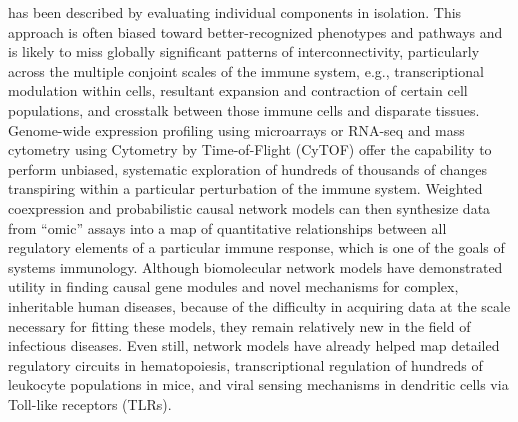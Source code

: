  has been described by evaluating individual components in isolation. This approach is often biased toward better-recognized phenotypes and pathways and is likely to miss globally significant patterns of interconnectivity, particularly across the multiple conjoint scales of the immune system, e.g., transcriptional modulation within cells, resultant expansion and contraction of certain cell populations, and crosstalk between those immune cells and disparate tissues.\autocite{Kidd2014} Genome-wide expression profiling using microarrays or RNA-seq and mass cytometry using Cytometry by Time-of-Flight (CyTOF) offer the capability to perform unbiased, systematic exploration of hundreds of thousands of changes transpiring within a particular perturbation of the immune system. Weighted coexpression and probabilistic causal network models can then synthesize data from “omic” assays into a map of quantitative relationships between all regulatory elements of a particular immune response, which is one of the goals of systems immunology.\autocite{Arazi2013,Germain2011} Although biomolecular network models have demonstrated utility in finding causal gene modules and novel mechanisms for complex, inheritable human diseases,\autocite{Chen2008,Emilsson2008,Huan2015,Zhang2013} because of the difficulty in acquiring data at the scale necessary for fitting these models, they remain relatively new in the field of infectious diseases. Even still, network models have already helped map detailed regulatory circuits in hematopoiesis, transcriptional regulation of hundreds of leukocyte populations in mice, and viral sensing mechanisms in dendritic cells via Toll-like receptors (TLRs).\autocite{Kidd2014}

